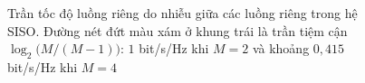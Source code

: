 \begin{figure}[htbp]
\centering
\resizebox{\textwidth}{!}{}
\caption[Trần tốc độ luồng riêng do nhiễu giữa các luồng riêng trong hệ SISO]{Trần tốc độ luồng riêng do nhiễu giữa các luồng riêng trong hệ SISO. Đường nét đứt màu xám ở khung trái là trần tiệm cận $\log_2\big(M/(M-1)\big)$: $1$ bit/s/Hz khi $M = 2$ và khoảng $0,415$ bit/s/Hz khi $M = 4$}
\label{fig:ch2-tran-toc-do}
\end{figure}
